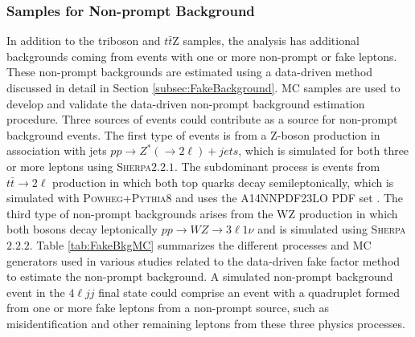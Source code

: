 \subsubsection{Samples for Non-prompt Background}
\label{subsubsec:FakeBkgSamples}
In addition to the triboson and $t\bar{t}$Z samples, the analysis has additional backgrounds coming from events with one or more non-prompt or fake leptons. These non-prompt backgrounds are estimated using a data-driven method discussed in detail in Section \ref{subsec:FakeBackground}. MC samples are used to develop and validate the data-driven non-prompt background estimation procedure. Three sources of events could contribute as a source for non-prompt background events. The first type of events is from a Z-boson production in association with jets $pp \rightarrow Z^{*} (\rightarrow 2\ell) +jets$, which is simulated for both three or more leptons using \textsc{Sherpa}$2.2.1$. The subdominant process is events from $t\bar{t}\rightarrow 2\ell$ production in which both top quarks decay semileptonically, which is simulated with \textsc{Powheg+Pythia8} and uses the A14NNPDF23LO PDF set \cite{PowhegPythia}. The third type of non-prompt backgrounds arises from the WZ production in which both bosons decay leptonically $pp \rightarrow WZ \rightarrow 3 \ell 1\nu $ and is simulated using \textsc{Sherpa}$2.2.2$. Table \ref{tab:FakeBkgMC} summarizes the different processes and MC generators used in various studies related to the data-driven fake factor method to estimate the non-prompt background. A simulated non-prompt background event in the $4\ell jj$ final state could comprise an event with a quadruplet formed from one or more fake leptons from a non-prompt source, such as misidentification and other remaining leptons from these three physics processes.

